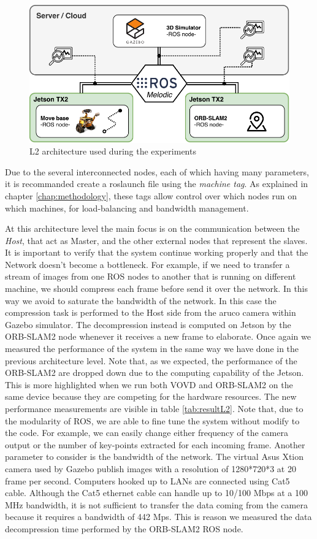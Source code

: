 \begin{figure}[htbp]
	\centering
	\includegraphics[width=\textwidth]{images/L2-arch-exp}
	\caption{L2 architecture used during the experiments}
	\label{fig:l2arch-exp}
\end{figure}

Due to the several interconnected nodes, each of which having many parameters, it is recommanded create a roslaunch file  using the \textit{machine tag}. As explained in chapter \ref{chap:methodology}, these tags allow control over which nodes run on which machines, for load-balancing and bandwidth management.

At this architecture level the main focus is on the communication between the \textit{Host}, that act as Master, and the other external nodes that represent the slaves. It is important to verify that the system continue working properly and that the Network doesn't become a bottleneck. For example, if we need to transfer a stream of images from one ROS nodes to another that is running on different machine, we should compress each frame before send it over the network. In this way we avoid to saturate the bandwidth of the network. In this case the compression task is performed to the Host side from the aruco camera within Gazebo simulator. The decompression instead is computed on Jetson by the ORB-SLAM2 node whenever it receives a new frame to elaborate.
Once again we measured the performance of the system in the same way we have done in the previous architecture level.
Note that, as we expected, the performance of the ORB-SLAM2 are dropped down due to the computing capability of the Jetson. This is more highlighted when we run both VOVD and ORB-SLAM2 on the same device because they are competing for the hardware resources.
The new performance measurements are visible in table \ref{tab:resultL2}.
Note that, due to the modularity of ROS, we are able to fine tune the system without modify to the code. For example, we can easily change either frequency of the camera output or the number of key-points extracted for each incoming frame.
Another parameter to consider is the bandwidth of the network. The virtual Asus Xtion camera used by Gazebo publish images with a resolution of 1280*720*3 at 20 frame per second.
Computers hooked up to LANs are connected using Cat5 cable. Although the Cat5 ethernet cable can handle up to 10/100 Mbps at a 100 MHz bandwidth, it is not sufficient to transfer the data coming from the camera because it requires a bandwidth of 442 Mps.
This is reason we measured the data decompression time performed by the ORB-SLAM2 ROS node.




